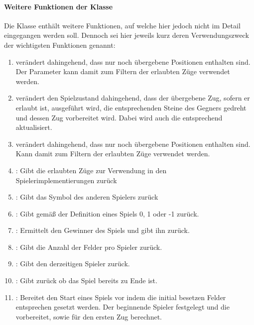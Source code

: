 \paragraph{Weitere Funktionen der Klasse }
Die Klasse  enthält weitere Funktionen, auf welche hier jedoch nicht im Detail eingegangen werden soll. Dennoch sei hier jeweils kurz deren Verwendungszweck der wichtigsten Funktionen genannt:
\begin{enumerate}
\item {} verändert  dahingehend, dass nur noch übergebene Positionen enthalten sind. Der Parameter kann damit zum Filtern der erlaubten Züge verwendet werden.
\item {} verändert den Spielzustand dahingehend, dass der übergebene Zug, sofern er erlaubt ist, ausgeführt wird, die entsprechenden Steine des Gegners gedreht und dessen Zug vorbereitet wird. Dabei wird auch die  entsprechend aktualisiert.
\item {} verändert  dahingehend, dass nur noch übergebene Positionen enthalten sind. Kann damit zum Filtern der erlaubten Züge verwendet werden.
\item {}: Gibt die erlaubten Züge zur Verwendung in den \\Spielerimplementierungen zurück
\item {}: Gibt das Symbol des anderen Spielers zurück
\item {}: Gibt gemäß der Definition eines Spiels 0, 1 oder -1 zurück.
\item {}: Ermittelt den Gewinner des Spiels und gibt ihn zurück.
\item {}: Gibt die Anzahl der Felder pro Spieler zurück.
\item {}: Gibt den derzeitigen Spieler zurück.
\item {}: Gibt zurück ob das Spiel bereits zu Ende ist.
\item {}: Bereitet den Start eines Spiels vor indem die initial besetzen Felder entsprechen gesetzt werden. Der beginnende Spieler festgelegt und die   vorbereitet, sowie  für den ersten Zug berechnet.
\end{enumerate}

